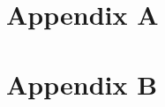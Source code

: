 \appendix
\begin{appendices}

\section{Appendix A}
\blindtext[1]

\section{Appendix B}
\blindtext[1]

\end{appendices}